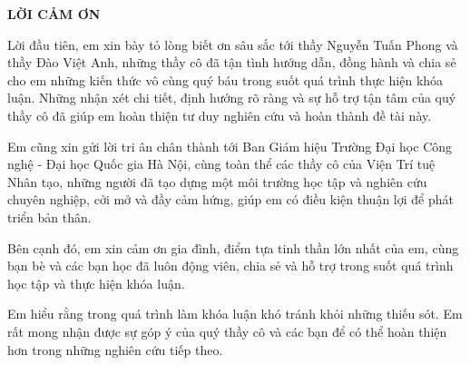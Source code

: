 \thispagestyle{empty}
\begin{center}
\fontsize{13pt}{1pt}\selectfont
    \textbf{LỜI CẢM ƠN}
\end{center}

\fontsize{13pt}{1pt}\selectfont
\vspace{1cm}
Lời đầu tiên, em xin bày tỏ lòng biết ơn sâu sắc tới thầy Nguyễn Tuấn Phong và thầy Đào Việt Anh, những thầy cô đã tận tình hướng dẫn, đồng hành và chia sẻ cho em những kiến thức vô cùng quý báu trong suốt quá trình thực hiện khóa luận. Những nhận xét chi tiết, định hướng rõ ràng và sự hỗ trợ tận tâm của quý thầy cô đã giúp em hoàn thiện tư duy nghiên cứu và hoàn thành đề tài này.

Em cũng xin gửi lời tri ân chân thành tới Ban Giám hiệu Trường Đại học Công nghệ - Đại học Quốc gia Hà Nội, cùng toàn thể các thầy cô của Viện Trí tuệ Nhân tạo, những người đã tạo dựng một môi trường học tập và nghiên cứu chuyên nghiệp, cởi mở và đầy cảm hứng, giúp em có điều kiện thuận lợi để phát triển bản thân.

Bên cạnh đó, em xin cảm ơn gia đình, điểm tựa tinh thần lớn nhất của em, cùng bạn bè và các bạn học đã luôn động viên, chia sẻ và hỗ trợ trong suốt quá trình học tập và thực hiện khóa luận.

Em hiểu rằng trong quá trình làm khóa luận khó tránh khỏi những thiếu sót. Em rất mong nhận được sự góp ý của quý thầy cô và các bạn để có thể hoàn thiện hơn trong những nghiên cứu tiếp theo.
